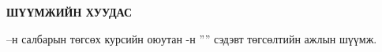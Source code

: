 \newpage

\begin{titlepage}
	\begin{center}

		{\scshape\Large \univname\par} %
		{\scshape\large \facname\par}\vspace{1cm} %

		\textbf{{\Large ШҮҮМЖИЙН ХУУДАС}}\\[1cm]

	\end{center}

	\normalsize

	\deptname --н салбарын төгсөх курсийн оюутан \shortname -н ''\ttitle'' сэдэвт төгсөлтийн ажлын шүүмж.


\end{titlepage}
